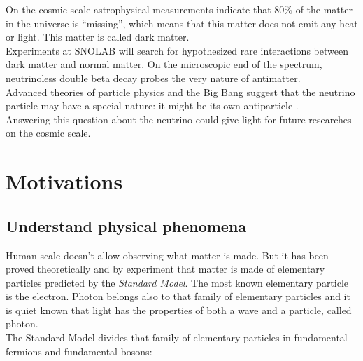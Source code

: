\documentclass[a4paper, 11pt]{report}%
\begin{document}
  On the cosmic scale astrophysical measurements indicate that $80\%$ of the matter in the universe is ``missing'', which means
  that this matter does not emit any heat or light. This matter is called dark matter.\\
  Experiments at SNOLAB will search for hypothesized rare interactions between dark matter and normal matter. On the microscopic end of 
  the spectrum, neutrinoless double beta decay probes the very nature of antimatter.\\
  Advanced theories of particle physics and the Big Bang suggest that the neutrino particle may have a special nature: it might be its 
  own antiparticle \cite{ref:majorana_fermions}.\\
  Answering this question about the neutrino could give light for future researches on the cosmic scale. 
  \\
  


\chapter{Motivations}

  \section{Understand physical phenomena} 
  
  Human scale doesn't allow observing what matter is made. But it has been proved theoretically and by 
  experiment that matter is made of elementary particles \cite{ref:modern_particle_physics} predicted by the \textit{Standard Model}. 
  The most known elementary particle is the electron. Photon belongs also to that family of elementary particles and it is quiet known that 
  light has the properties of both a wave and a particle, called photon.\\
  The Standard Model divides that family of elementary particles in fundamental fermions and fundamental bosons:
  
  
\end{document}

